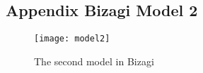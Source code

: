 \begin{landscape}
\section{Appendix Bizagi Model 2}\label{app:appendix_model2}
\begin{figure}[!ht]
	\texttt{[image: model2]}
	\caption{The second model in Bizagi}
	\label{fig:model2}
\end{figure}
\end{landscape}

\clearpage
